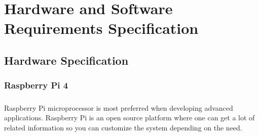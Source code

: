 \chapter{Hardware and Software Requirements Specification}
\section{Hardware Specification}
\subsection{Raspberry Pi 4}
\paragraph{} Raspberry Pi microprocessor is most preferred when developing advanced \\applications. Raspberry Pi is an open source platform where one can get a lot of related information so you can customize the system depending on the need. 
